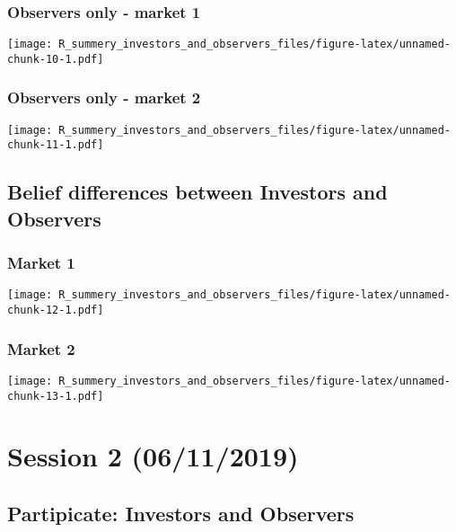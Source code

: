 \documentclass[]{article}
\begin{document}
\hypertarget{observers-only---market-1}{%
\subsubsection{Observers only - market
1}\label{observers-only---market-1}}

\texttt{[image: R\_summery\_investors\_and\_observers\_files/figure-latex/unnamed-chunk-10-1.pdf]}

\hypertarget{observers-only---market-2}{%
\subsubsection{Observers only - market
2}\label{observers-only---market-2}}

\texttt{[image: R\_summery\_investors\_and\_observers\_files/figure-latex/unnamed-chunk-11-1.pdf]}

\hypertarget{belief-differences-between-investors-and-observers}{%
\subsection{Belief differences between Investors and
Observers}\label{belief-differences-between-investors-and-observers}}

\hypertarget{market-1}{%
\subsubsection{Market 1}\label{market-1}}

\texttt{[image: R\_summery\_investors\_and\_observers\_files/figure-latex/unnamed-chunk-12-1.pdf]}

\hypertarget{market-2}{%
\subsubsection{Market 2}\label{market-2}}

\texttt{[image: R\_summery\_investors\_and\_observers\_files/figure-latex/unnamed-chunk-13-1.pdf]}

\hypertarget{session-2-06112019}{%
\section{Session 2 (06/11/2019)}\label{session-2-06112019}}

\hypertarget{partipicate-investors-and-observers-1}{%
\subsection{Partipicate: Investors and
Observers}\label{partipicate-investors-and-observers-1}}
\end{document}
